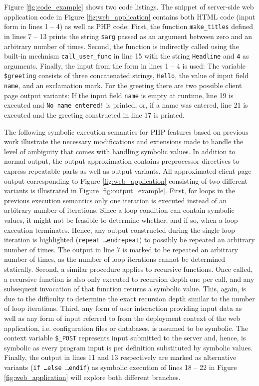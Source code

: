 \documentclass[sigconf]{acmart}
\begin{document}
Figure \ref{fig:code_example} shows two code listings. The snippet of server-side web
application code in Figure \ref{fig:web_application} contains both HTML code
(input form in lines 1 -- 4) as well as PHP code: First, the function
\texttt{make\_titles} defined in lines 7 – 13 prints the string \texttt{\$arg} passed as an argument between zero and an arbitrary number of
times. Second, the function is indirectly called using the built-in mechnism
\texttt{call\_user\_func} in line 15 with the string \texttt{Headline} and
\texttt{4} as arguments.  Finally, the input from the form in lines 1 – 4 is
used: The variable \texttt{\$greeting} consists of three concatenated strings,
\texttt{Hello}, the value of input field \texttt{name}, and an exclamation mark.
For the greeting there are two possible client page output
variants: If the input field \texttt{name} is empty at runtime, line 19 is
executed and \texttt{No name entered!} is printed, or, if a name was entered,
line 21 is executed and the greeting constructed in line 17 is printed.


The following symbolic execution semantics for PHP features based on
previous work \cite{Nguyen:2014:BCG:2635868.2635928} illustrate the necessary
modifications and extensions made to handle the level of ambiguity that comes with handling symbolic values. In addition to normal output, the
output approximation contains preprocessor directives to express
repeatable parts as well as output variants. All approximated client page
output corresponding to Figure \ref{fig:web_application} consisting of two different variants
is illustrated in Figure \ref{fig:output_example}.
First, for loops in the previous execution semantics
\cite{Nguyen:2014:BCG:2635868.2635928} only one iteration is executed instead of
an arbitrary number of iterations. Since a loop condition can contain symbolic
values, it might not be feasible to determine whether, and if so, when a loop
execution terminates. Hence, any output constructed during the single loop
iteration is highlighted (\texttt{repeat \ldots endrepeat}) to possibly be repeated an arbitrary number of times. The output in line 7 is marked to be repeated an arbitrary number of times, as the number of loop iterations cannot be determined statically. Second, a similar procedure
applies to recursive functions. Once called, a recursive function is  also only
executed to recursion depth one per call, and any subsequent invocation of that
function returns a symbolic value. This, again, is due to the difficulty to
determine the exact recursion depth similar to the number of loop iterations.
Third, any form of user interaction providing input data as well as any form of input referred
to from the deployment context of the web application, i.e. configuration files
or databases, is assumed to be symbolic. The context variable
\texttt{\$\_POST} represents input submitted to the server and, hence, is
symbolic as every program input is per definition substituted by symbolic values. Finally, the
output in lines 11 and 13 respectively are marked as alternative variants
(\texttt{if \ldots else \ldots endif}) as symbolic execution of lines 18 – 22
in Figure \ref{fig:web_application} will explore both different branches.
\end{document}
